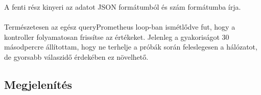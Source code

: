 A fenti rész kinyeri az adatot JSON formátumból és szám formátumba írja.\\
\\
Természetesen az egész queryPrometheus loop-ban ismétlődve fut, hogy a kontroller folyamatosan frissítse az értékeket. 
Jelenleg a gyakoriságot 30 másodpercre állítottam, hogy ne terhelje a próbák során feleslegesen a hálózatot, 
de gyorsabb válaszidő érdekében ez növelhető.
\subsection{Megjelenítés}